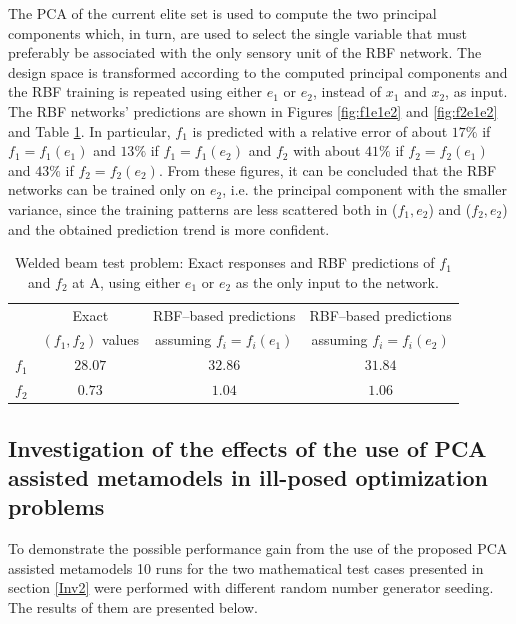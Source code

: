 The PCA of the current elite set is used to compute the two principal components which, in turn, are used to select the single variable that must preferably be associated with the only sensory unit of the RBF network. The design space is transformed according to the computed principal components and the RBF training is repeated using either $e_1$ or $e_2$, instead of $x_1$ and $x_2$, as input. 
The RBF networks' predictions are shown in Figures \ref{fig:f1e1e2} and \ref{fig:f2e1e2} and Table \ref{tab:f1f2e1e2}. 
In particular, $f_1$ is predicted with a relative error of about $17\%$ if $f_1\!=\!f_1(e_1)$ and $13\%$ if $f_1\!=\!f_1(e_2)$ and $f_2$ with about $41\%$ if $f_2\!=\!f_2(e_1)$ and $43\%$ if $f_2\!=\!f_2(e_2)$. From these figures, it can be concluded that the RBF networks can be trained only on $e_2$, i.e. the principal component with the smaller variance, since the training patterns are less scattered both in ($f_1,e_2$) and ($f_2,e_2$) and the obtained prediction trend is more confident.




\begin{table}[h!]
\begin{center}
\begin{tabular}{c  c | c | c}
		&      Exact  	 		&  RBF--based predictions    &  RBF--based  predictions   \\
		&  $(f_1,f_2)$ values   &  assuming $f_i=f_i(e_1)$    &   assuming $f_i=f_i(e_2)$  \\
		\hline
$f_1$	& $28.07$   &      $32.86$     &      $31.84$        \\
$f_2$	& $0.73$     &      $ 1.04$     &       $ 1.06$        \\
\end{tabular}
\end{center}
\caption{Welded beam test problem: Exact responses and RBF predictions of $f_1$ and $f_2$ at A, using either $e_1$ or $e_2$ as the only input to the network.}
\label{tab:f1f2e1e2}
\end{table}


\subsection{Investigation of the effects of the use of PCA assisted metamodels in ill-posed optimization problems}

To demonstrate the possible performance gain from the use of the proposed PCA assisted metamodels 10 runs for the two mathematical test cases presented in section \ref{Inv2} were performed with different random number generator seeding. The results of them are presented below. 

